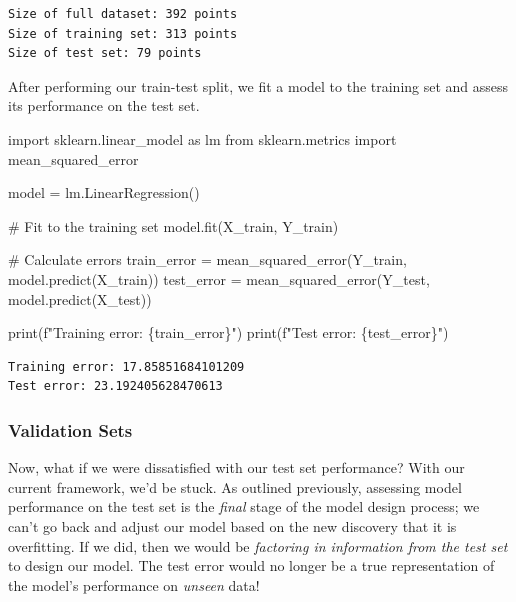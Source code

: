\documentclass[
  letterpaper,
  DIV=11,
  numbers=noendperiod]{scrreprt}
\newenvironment{Shaded}{\begin{snugshade}}{\end{snugshade}}
\newcommand{\BuiltInTok}[1]{\textcolor[rgb]{0.00,0.23,0.31}{#1}}
\newcommand{\CommentTok}[1]{\textcolor[rgb]{0.37,0.37,0.37}{#1}}
\newcommand{\ImportTok}[1]{\textcolor[rgb]{0.00,0.46,0.62}{#1}}
\newcommand{\NormalTok}[1]{\textcolor[rgb]{0.00,0.23,0.31}{#1}}
\newcommand{\OperatorTok}[1]{\textcolor[rgb]{0.37,0.37,0.37}{#1}}
\newcommand{\SpecialCharTok}[1]{\textcolor[rgb]{0.37,0.37,0.37}{#1}}
\newcommand{\SpecialStringTok}[1]{\textcolor[rgb]{0.13,0.47,0.30}{#1}}
\begin{document}
\begin{verbatim}
Size of full dataset: 392 points
Size of training set: 313 points
Size of test set: 79 points
\end{verbatim}

After performing our train-test split, we fit a model to the training
set and assess its performance on the test set.

\begin{Shaded}
\begin{Highlighting}[]
\ImportTok{import}\NormalTok{ sklearn.linear\_model }\ImportTok{as}\NormalTok{ lm}
\ImportTok{from}\NormalTok{ sklearn.metrics }\ImportTok{import}\NormalTok{ mean\_squared\_error}

\NormalTok{model }\OperatorTok{=}\NormalTok{ lm.LinearRegression()}

\CommentTok{\# Fit to the training set}
\NormalTok{model.fit(X\_train, Y\_train)}

\CommentTok{\# Calculate errors}
\NormalTok{train\_error }\OperatorTok{=}\NormalTok{ mean\_squared\_error(Y\_train, model.predict(X\_train))}
\NormalTok{test\_error }\OperatorTok{=}\NormalTok{ mean\_squared\_error(Y\_test, model.predict(X\_test))}

\BuiltInTok{print}\NormalTok{(}\SpecialStringTok{f"Training error: }\SpecialCharTok{\{}\NormalTok{train\_error}\SpecialCharTok{\}}\SpecialStringTok{"}\NormalTok{)}
\BuiltInTok{print}\NormalTok{(}\SpecialStringTok{f"Test error: }\SpecialCharTok{\{}\NormalTok{test\_error}\SpecialCharTok{\}}\SpecialStringTok{"}\NormalTok{)}
\end{Highlighting}
\end{Shaded}

\begin{verbatim}
Training error: 17.85851684101209
Test error: 23.192405628470613
\end{verbatim}

\subsubsection{Validation Sets}\label{validation-sets}

Now, what if we were dissatisfied with our test set performance? With
our current framework, we'd be stuck. As outlined previously, assessing
model performance on the test set is the \emph{final} stage of the model
design process; we can't go back and adjust our model based on the new
discovery that it is overfitting. If we did, then we would be
\emph{factoring in information from the test set} to design our model.
The test error would no longer be a true representation of the model's
performance on \emph{unseen} data!
\end{document}
